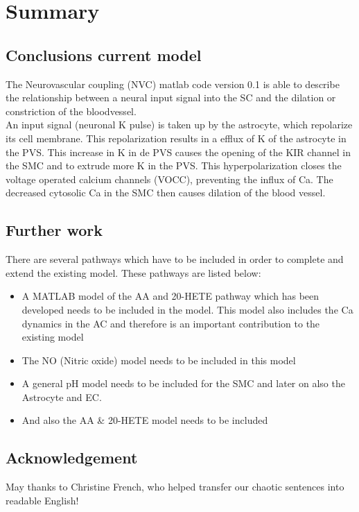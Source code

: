 \section{Summary}

\subsection{Conclusions current model}
The Neurovascular coupling (NVC) matlab code version 0.1 is able to describe the relationship between a neural input signal into the \gls{SC} and the dilation or constriction of the bloodvessel. \\
An input signal (neuronal \gls{K} pulse) is taken up by the astrocyte, which repolarize its cell membrane. This repolarization results in a efflux of \gls{K} of the astrocyte in the PVS. This increase in \gls{K} in de PVS causes the opening of the KIR channel in the SMC and to extrude more \gls{K} in the PVS. This hyperpolarization closes the voltage operated calcium channels (VOCC), preventing the influx of \gls{Ca}. The decreased cytosolic \gls{Ca} in the SMC then causes dilation of the blood vessel.\\




\subsection{Further work} \label{sec:furtherwork}

There are several pathways which have to be included in order to complete and extend the existing model. These pathways are listed below:
\begin{itemize}
\item A MATLAB model of the AA and 20-HETE pathway which has been developed needs to be included in the model. This model also includes the \gls{Ca} dynamics in the AC and therefore is an important contribution to the existing model
\item The NO (Nitric oxide) model needs to be included in this model
\item A general pH model needs to be included for the SMC and later on also the Astrocyte and EC.
\item And also the AA \& 20-HETE model needs to be included
\end{itemize}


\subsection*{Acknowledgement}
May thanks to Christine French, who helped transfer our chaotic sentences into readable English! 

